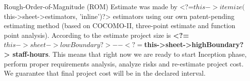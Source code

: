 
Rough-Order-of-Magnitude (ROM) Estimate was made by 
<?=$this->itemize($this->sheet->estimators, 'inline')?>
estimators using our own patent-pending estimating method (based on COCOMO-II, 
three-point estimate and function point analysis). According to the estimate
project size is
\textbf{<?=$this->sheet->lowBoundary?>--<?=$this->sheet->highBoundary?> staff-hours}. 
This means that right now we are ready to start Inception phase, perform proper requirements
analysis, analyze risks and re-estimate project cost. We guarantee that final project
cost will be in the declared interval.

